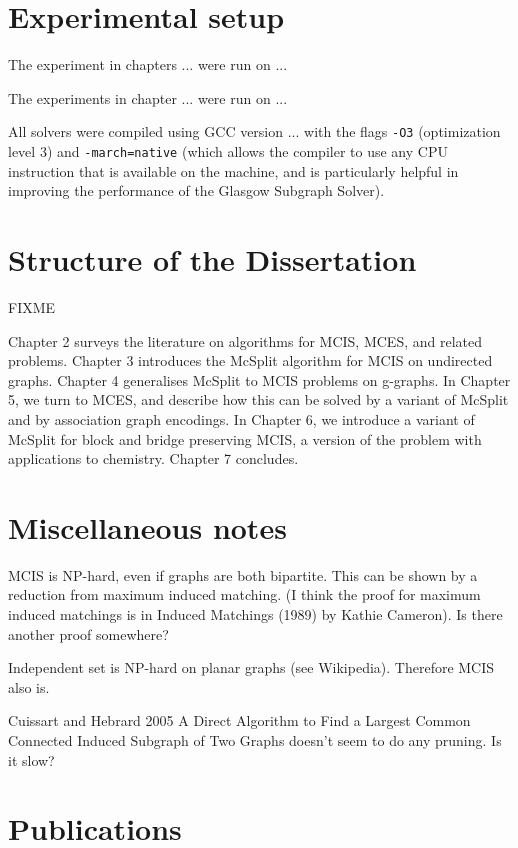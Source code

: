 \section{Experimental setup}

The experiment in chapters ... were run on ...

The experiments in chapter ... were run on ...

All solvers were compiled using GCC version ... with the flags
\texttt{-O3} (optimization level 3) and \texttt{-march=native}
(which allows the compiler to use any CPU instruction that is available
on the machine, and is particularly helpful in improving the performance
of the Glasgow Subgraph Solver).

\section{Structure of the Dissertation}

FIXME

Chapter 2 surveys the literature on algorithms for MCIS, MCES, and related
problems. Chapter 3 introduces the McSplit algorithm for MCIS on undirected
graphs. Chapter 4 generalises McSplit to MCIS problems on g-graphs. In Chapter
5, we turn to MCES, and describe how this can be solved by a variant of McSplit
and by association graph encodings. In Chapter 6, we introduce a variant of
McSplit for block and bridge preserving MCIS, a version of the problem with
applications to chemistry. Chapter 7 concludes.

\section{Miscellaneous notes}

MCIS is NP-hard, even if graphs are both bipartite.  This can be shown by a
reduction from maximum induced matching.  (I think the proof for maximum induced
matchings is in Induced Matchings (1989) by Kathie Cameron). Is there another
proof somewhere?

Independent set is NP-hard on planar graphs (see Wikipedia).  Therefore
MCIS also is.

Cuissart and Hebrard 2005 A Direct Algorithm to Find a Largest Common
Connected Induced Subgraph of Two Graphs doesn't seem to do any
pruning.  Is it slow?

\section{Publications}

